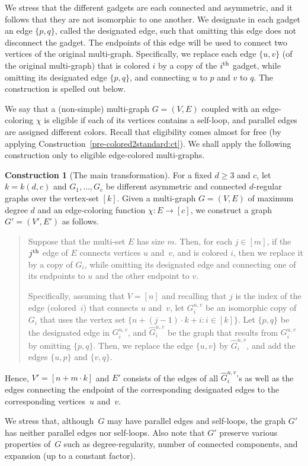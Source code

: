 \documentclass[10pt,a4paper]{article}
\theoremstyle{definition}
\newtheorem{construction}[theorem]{Construction}
\newcommand{\xth}{{\rm th}}
\newcommand{\GG}{{\hat G}}
\newcommand{\BCT}{\begin{construction}} \newcommand{\ECT}{\end{construction}}
\begin{document}
We stress that the different gadgets are
each connected and asymmetric,
and it follows that they are not isomorphic to one another.
We designate in each gadget an edge $\{p,q\}$,
called the {\sf designated edge},
such that omitting this edge does not disconnect the gadget.
The endpoints of this edge
will be used to connect two vertices of the original multi-graph.
Specifically, we replace each edge $\{u,v\}$ (of the original multi-graph)
that is colored $i$ by a copy of the $i^\xth$ gadget,
while omitting its designated edge $\{p,q\}$,
and connecting $u$ to $p$ and $v$ to $q$.
The construction is spelled out below.

We say that a (non-simple) multi-graph $G=(V,E)$
coupled with an edge-coloring $\chi$ is {\sf eligible}
if each of its vertices contains a self-loop,
and parallel edges are assigned different colors.
Recall that eligibility comes almost for free
(by applying Construction~\ref{pre-colored2standard:ct}).
We shall apply the following construction
only to eligible edge-colored multi-graphs.

\BCT[The main transformation]
\label{colored2standard:ct}
For a fixed $d\geq3$ and $c$, let $k=k(d,c)$
and $G_1,\ldots,G_c$ be different asymmetric
and connected $d$-regular graphs over the vertex-set $[k]$.
%
Given a multi-graph $G=(V,E)$ of maximum degree $d$
and an edge-coloring function $\chi\!:\!E\!\to\![c]$,
we construct a graph $G'=(V',E')$ as follows.
\begin{quote}
%
Suppose that the multi-set $E$ has size $m$.
Then, for each $j\in[m]$, if the $j^\xth$ edge of $E$
connects vertices $u$ and~$v$, and is colored $i$,
then we replace it by a copy of $G_i$, 
%
while omitting its designated edge and connecting
one of its endpoints to $u$ and the other endpoint to $v$.

Specifically, assuming that $V=[n]$ and
recalling that $j$ is the index of the edge
{\rm(colored~$i$)} that connects $u$ and~$v$,
let $G_i^{u,v}$ be an isomorphic copy of $G_i$
that uses the vertex set $\{n+(j-1)\cdot k+i:i\!\in\![k]\}$.
Let $\{p,q\}$ be the designated edge in $G_i^{u,v}$,
and $\GG_i^{u,v}$ be the graph that results from $G_i^{u,v}$
by omitting $\{p,q\}$.
Then, we replace the edge $\{u,v\}$ by $\GG_i^{u,v}$,
and add the edges $\{u,p\}$ and $\{v,q\}$.
%
\end{quote}
Hence, $V'=[n+m\cdot k]$
and $E'$ consists of the edges of all $\GG_i^{u,v}$'s
as well as the edges connecting the endpoint of the corresponding
designated edges to the corresponding vertices~$u$ and~$v$.
\ECT
We stress that, although~$G$ may have parallel edges and self-loops,
the graph $G'$ has neither parallel edges nor self-loops.
Also note that $G'$ preserve various properties of~$G$
such as degree-regularity, number of connected components,
and expansion (up to a constant factor).
\end{document}
